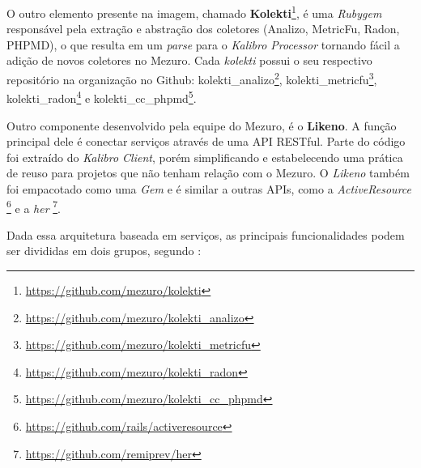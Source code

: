 O outro elemento presente na imagem, chamado \textbf{Kolekti}\footnote{\url{https://github.com/mezuro/kolekti}},
é uma \textit{Rubygem} responsável pela extração e abstração dos coletores
(Analizo, MetricFu, Radon, PHPMD), o que resulta em um \textit{parse} para o
\textit{Kalibro Processor} tornando fácil a adição de novos coletores no Mezuro.
Cada \textit{kolekti} possui o seu respectivo repositório na organização no
Github: kolekti\_analizo\footnote{\url{https://github.com/mezuro/kolekti\_analizo}},
kolekti\_metricfu\footnote{\url{https://github.com/mezuro/kolekti\_metricfu}},
kolekti\_radon\footnote{\url{https://github.com/mezuro/kolekti\_radon}} e
kolekti\_cc\_phpmd\footnote{\url{https://github.com/mezuro/kolekti\_cc\_phpmd}}.

Outro componente desenvolvido pela equipe do Mezuro, é o \textbf{Likeno}. A
função principal dele é conectar serviços através de uma API RESTful. Parte do
código foi extraído do \textit{Kalibro Client}, porém simplificando e
estabelecendo uma prática de reuso para projetos que não tenham relação com o
Mezuro. O \textit{Likeno} também foi empacotado como uma \textit{Gem} e é
similar a outras APIs, como a \textit{ActiveResource}
\footnote{\url{https://github.com/rails/activeresource}} e a \textit{her}
\footnote{\url{https://github.com/remiprev/her}}.

Dada essa arquitetura baseada em serviços, as principais funcionalidades podem
ser divididas em dois grupos, segundo :

